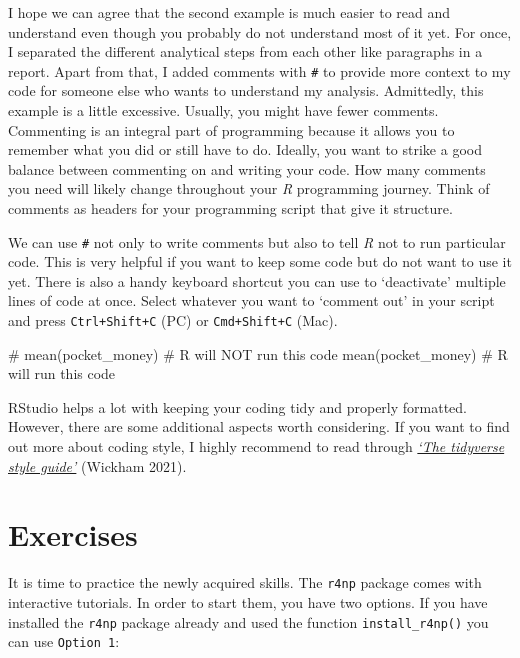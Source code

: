 \documentclass[
  letterpaper,
  DIV=11,
  numbers=noendperiod]{scrreprt}
\newenvironment{Shaded}{\begin{snugshade}}{\end{snugshade}}
\newcommand{\CommentTok}[1]{\textcolor[rgb]{0.37,0.37,0.37}{#1}}
\newcommand{\FunctionTok}[1]{\textcolor[rgb]{0.28,0.35,0.67}{#1}}
\newcommand{\NormalTok}[1]{\textcolor[rgb]{0.00,0.23,0.31}{#1}}
\begin{document}
I hope we can agree that the second example is much easier to read and
understand even though you probably do not understand most of it yet.
For once, I separated the different analytical steps from each other
like paragraphs in a report. Apart from that, I added comments with
\texttt{\#} to provide more context to my code for someone else who
wants to understand my analysis. Admittedly, this example is a little
excessive. Usually, you might have fewer comments. Commenting is an
integral part of programming because it allows you to remember what you
did or still have to do. Ideally, you want to strike a good balance
between commenting on and writing your code. How many comments you need
will likely change throughout your \emph{R} programming journey. Think
of comments as headers for your programming script that give it
structure.

We can use \texttt{\#} not only to write comments but also to tell
\emph{R} not to run particular code. This is very helpful if you want to
keep some code but do not want to use it yet. There is also a handy
keyboard shortcut you can use to `deactivate' multiple lines of code at
once. Select whatever you want to `comment out' in your script and press
\texttt{Ctrl+Shift+C} (PC) or \texttt{Cmd+Shift+C} (Mac).

\begin{Shaded}
\begin{Highlighting}[]
\CommentTok{\# mean(pocket\_money) \# R will NOT run this code}
\FunctionTok{mean}\NormalTok{(pocket\_money)   }\CommentTok{\# R will run this code}
\end{Highlighting}
\end{Shaded}

RStudio helps a lot with keeping your coding tidy and properly
formatted. However, there are some additional aspects worth considering.
If you want to find out more about coding style, I highly recommend to
read through \href{https://style.tidyverse.org}{\emph{`The tidyverse
style guide'}} (Wickham 2021).\\

\section{Exercises}\label{sec-exercises-r_basics}

It is time to practice the newly acquired skills. The \texttt{r4np}
package comes with interactive tutorials. In order to start them, you
have two options. If you have installed the \texttt{r4np} package
already and used the function \texttt{install\_r4np()} you can use
\texttt{Option\ 1}:
\end{document}
